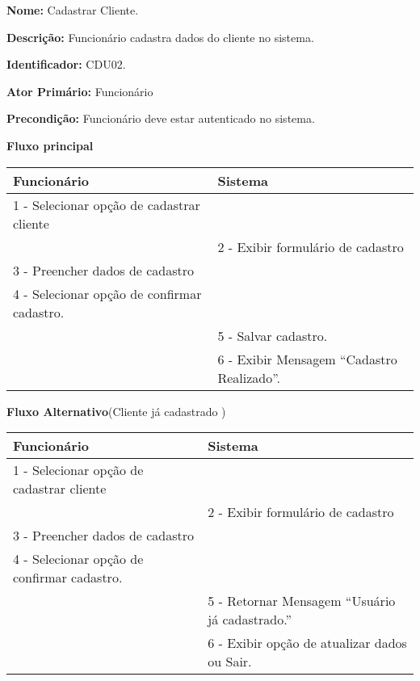 \par
\textbf{Nome:} Cadastrar Cliente.
\par
\textbf{Descrição:} Funcionário cadastra dados do cliente no sistema.
\par 
\textbf{Identificador:} CDU02.
\par
\textbf{Ator Primário:} Funcionário	
\par
\textbf{Precondição:} Funcionário deve estar autenticado no sistema.
\par
\par
\textbf{Fluxo principal}\par
\begin{tabular}{|p{7cm}|p{7cm}|}
	\hline 
	Funcionário & Sistema \\ 
	\hline 	
	1 - Selecionar opção de cadastrar cliente &  \\ 
	\hline 
	& 
	
	2 - Exibir formulário de cadastro 
	\\ 
	\hline 
	3 - Preencher dados de cadastro
	& 		
	
	\\ 
	\hline 
	4 - Selecionar opção de confirmar cadastro.
	& 
	
	\\ 
	\hline 
	& 	
	
	5 - Salvar cadastro. 	
	\\ 
	\hline 
	& 
	
	6 - Exibir Mensagem “Cadastro Realizado”.
	\\ 		
	\hline 
\end{tabular} 
\vspace{12px}
\par
\textbf{Fluxo Alternativo}(Cliente já cadastrado )\par
\begin{tabular}{|p{7cm}|p{7cm}|}
	\hline 
	Funcionário & Sistema \\ 
	\hline 	
	1 - Selecionar opção de cadastrar cliente &  \\ 
	\hline 
	& 
	
	2 - Exibir formulário de cadastro 
	\\ 
	\hline 
	3 - Preencher dados de cadastro
	& 		
	
	\\ 
	\hline 
	4 - Selecionar opção de confirmar cadastro.
	& 
	
	\\ 
	\hline 
	& 	
	
	5 - Retornar Mensagem “Usuário já cadastrado.”	
	\\ 
	\hline 
	& 
	
	6 - Exibir opção de atualizar dados  ou Sair.
	\\ 		
	\hline 
\end{tabular}
\vspace{12px}

